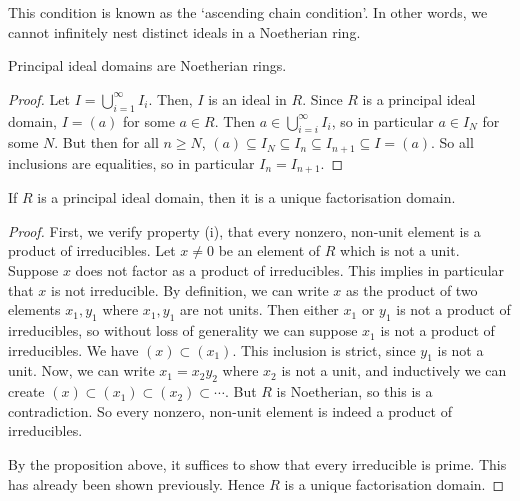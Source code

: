 This condition is known as the `ascending chain condition'.
In other words, we cannot infinitely nest distinct ideals in a Noetherian ring.
\begin{lemma}
	Principal ideal domains are Noetherian rings.
\end{lemma}
\begin{proof}
	Let \( I = \bigcup_{i=1}^\infty I_i \).
	Then, \( I \) is an ideal in \( R \).
	Since \( R \) is a principal ideal domain, \( I = (a) \) for some \( a \in R \).
	Then \( a \in \bigcup_{i=i}^\infty I_i \), so in particular \( a \in I_N \) for some \( N \).
	But then for all \( n \geq N \), \( (a) \subseteq I_N \subseteq I_{n} \subseteq I_{n+1} \subseteq I = (a) \).
	So all inclusions are equalities, so in particular \( I_n = I_{n+1} \).
\end{proof}
\begin{theorem}
	If \( R \) is a principal ideal domain, then it is a unique factorisation domain.
\end{theorem}
\begin{proof}
	First, we verify property (i), that every nonzero, non-unit element is a product of irreducibles.
	Let \( x \neq 0 \) be an element of \( R \) which is not a unit.
	Suppose \( x \) does not factor as a product of irreducibles.
	This implies in particular that \( x \) is not irreducible.
	By definition, we can write \( x \) as the product of two elements \( x_1, y_1 \) where \( x_1, y_1 \) are not units.
	Then either \( x_1 \) or \( y_1 \) is not a product of irreducibles, so without loss of generality we can suppose \( x_1 \) is not a product of irreducibles.
	We have \( (x) \subset (x_1) \).
	This inclusion is strict, since \( y_1 \) is not a unit.
	Now, we can write \( x_1 = x_2 y_2 \) where \( x_2 \) is not a unit, and inductively we can create \( (x) \subset (x_1) \subset (x_2) \subset \cdots \).
	But \( R \) is Noetherian, so this is a contradiction.
	So every nonzero, non-unit element is indeed a product of irreducibles.

	By the proposition above, it suffices to show that every irreducible is prime.
	This has already been shown previously.
	Hence \( R \) is a unique factorisation domain.
\end{proof}
